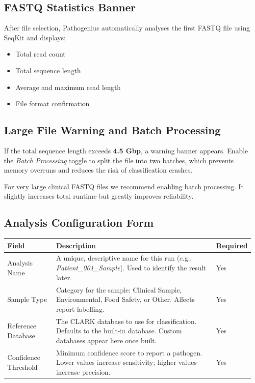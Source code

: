 \documentclass[12pt,a4paper]{report}
\newcommand{\field}[1]{\textit{#1}}
\begin{document}
\subsection{FASTQ Statistics Banner}

After file selection, Pathogenius automatically analyses the first FASTQ file using SeqKit and displays:
\begin{itemize}[leftmargin=1.5em]
  \item Total read count
  \item Total sequence length
  \item Average and maximum read length
  \item File format confirmation
\end{itemize}

\subsection{Large File Warning and Batch Processing}

If the total sequence length exceeds \textbf{4.5 Gbp}, a warning banner appears. Enable the \field{Batch Processing} toggle to split the file into two batches, which prevents memory overruns and reduces the risk of classification crashes.

\begin{tipbox}
  For very large clinical FASTQ files we recommend enabling batch processing. It slightly increases total runtime but greatly improves reliability.
\end{tipbox}

\subsection{Analysis Configuration Form}

\begin{center}
\begin{tabularx}{\textwidth}{lXl}
  \toprule
  \textbf{Field} & \textbf{Description} & \textbf{Required} \\
  \midrule
  Analysis Name &
  A unique, descriptive name for this run (e.g., \textit{Patient\_001\_Sample}). Used to identify the result later. &
  Yes \\[4pt]
  Sample Type &
  Category for the sample: Clinical Sample, Environmental, Food Safety, or Other. Affects report labelling. &
  Yes \\[4pt]
  Reference Database &
  The CLARK database to use for classification. Defaults to the built-in database. Custom databases appear here once built. &
  Yes \\[4pt]
  Confidence Threshold &
  Minimum confidence score to report a pathogen. Lower values increase sensitivity; higher values increase precision. &
  Yes \\
  \bottomrule
\end{tabularx}
\end{center}
\end{document}
